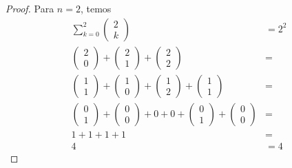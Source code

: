 \documentclass{article}
\begin{document}
\begin{proof}
Para $n = 2$, temos
\begin{equation}
	\begin{split}
	\sum\limits_{k=0}^{2}\left(\begin{array}{c} 2 \\ k \end{array} \right) & = 2^2\\
	\left(\begin{array}{c} 2 \\ 0 \end{array} \right) + \left(\begin{array}{c} 2 \\ 1 \end{array} \right) + \left(\begin{array}{c} 2 \\ 2 \end{array} \right) & = \\
	\left(\begin{array}{c} 1 \\ 1 \end{array} \right) + \left(\begin{array}{c} 1 \\ 0 \end{array} \right) + \left(\begin{array}{c} 1 \\ 2 \end{array} \right) + \left(\begin{array}{c} 1 \\ 1 \end{array} \right) & =\\
	\left(\begin{array}{c} 0 \\ 1 \end{array} \right) + \left(\begin{array}{c} 0 \\ 0 \end{array} \right) + 0 + 0 + \left(\begin{array}{c} 0 \\ 1 \end{array} \right) + \left(\begin{array}{c} 0 \\ 0 \end{array} \right) &=\\
	1 + 1 + 1 + 1 & = \\
	4 & = 4
	\end{split}
\end{equation}


\end{proof}
\end{document}
